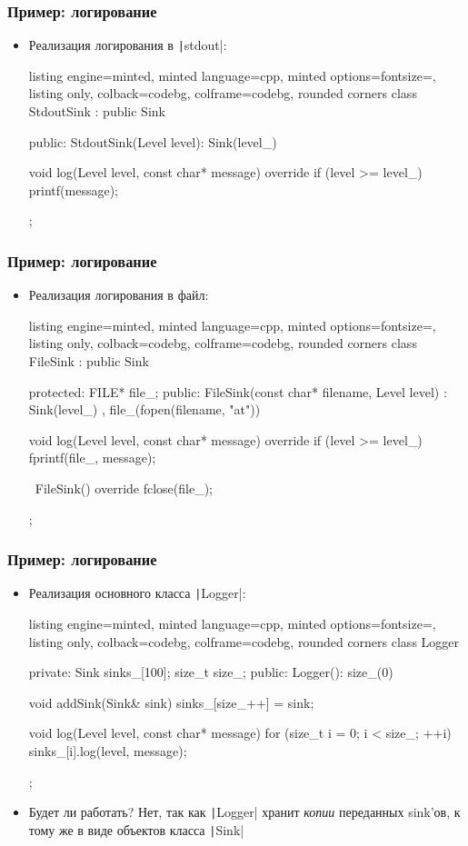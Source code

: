 \documentclass[10pt]{beamer}
\begin{document}
\begin{frame}[fragile]
\frametitle{Пример: логирование}
\begin{itemize}
\item Реализация логирования в \texttt|stdout|:
\begin{tcblisting}{listing engine=minted, minted language=cpp, minted options={fontsize=\scriptsize}, listing only, colback=codebg, colframe=codebg, rounded corners}
class StdoutSink : public Sink {
public:
  StdoutSink(Level level): Sink(level_) {}

  void log(Level level, const char* message) override {
    if (level >= level_)
      printf(message);
  }
};
\end{tcblisting}
\end{itemize}
\end{frame}

\begin{frame}[fragile]
\frametitle{Пример: логирование}
\begin{itemize}
\item Реализация логирования в файл:
\begin{tcblisting}{listing engine=minted, minted language=cpp, minted options={fontsize=\scriptsize}, listing only, colback=codebg, colframe=codebg, rounded corners}
class FileSink : public Sink {
protected:
  FILE* file_;
public:
  FileSink(const char* filename, Level level)
    : Sink(level_)
    , file_(fopen(filename, "at"))
  {}

  void log(Level level, const char* message) override {
    if (level >= level_)
      fprintf(file_, message);
  }

  ~FileSink() override {
    fclose(file_);
  }
};
\end{tcblisting}
\end{itemize}
\end{frame}

\begin{frame}[fragile]
\frametitle{Пример: логирование}
\begin{itemize}
\item Реализация основного класса \texttt|Logger|:
\begin{tcblisting}{listing engine=minted, minted language=cpp, minted options={fontsize=\scriptsize}, listing only, colback=codebg, colframe=codebg, rounded corners}
class Logger {
private:
  Sink sinks_[100];
  size_t size_;
public:
  Logger(): size_(0) {}

  void addSink(Sink& sink) {
    sinks_[size_++] = sink;
  }

  void log(Level level, const char* message) {
    for (size_t i = 0; i < size_; ++i)
      sinks_[i].log(level, message);
  }
};
\end{tcblisting}
\pause
{}
\item Будет ли работать? \pause Нет, так как \texttt|Logger| хранит \textit{копии} переданных sink'ов, к тому же в виде объектов класса \texttt|Sink|
\end{itemize}
\end{frame}
\end{document}
